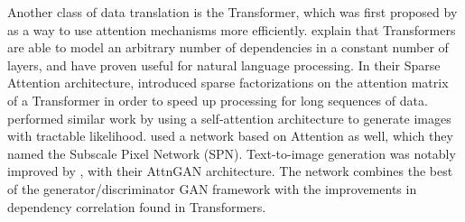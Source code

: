 \documentclass{article}
\begin{document}
Another class of data translation is the Transformer,
which was first proposed by \cite{attention_need}
as a way to use attention mechanisms more efficiently.
\cite{generative_transformers} explain that Transformers are able to
model an arbitrary number of dependencies in a constant number of layers,
and have proven useful for natural language processing.
In their Sparse Attention architecture, \cite{sparse_transformers} introduced
sparse factorizations on the attention matrix
of a Transformer in order to speed up processing for long sequences of
data.
\cite{image_transformer} performed similar work by using a self-attention
architecture to
generate images with tractable likelihood.
\cite{subscale_pixel} used a network based on Attention as well, which they named
the Subscale Pixel Network (SPN).
Text-to-image generation was notably improved by \cite{attngan}, with their
AttnGAN architecture. The network combines the best of the
generator/discriminator GAN framework with the improvements in
dependency correlation found in Transformers.
\end{document}
